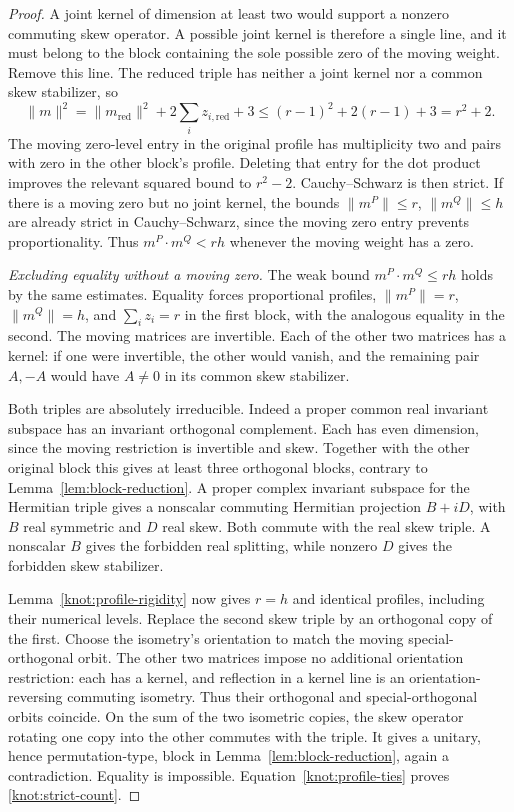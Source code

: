 \begin{proof}
A joint kernel of dimension at least two would support a nonzero
commuting skew operator.  A possible joint kernel is therefore a
single line, and it must belong to the block containing the sole
possible zero of the moving weight.  Remove this line.  The reduced
triple has neither a joint kernel nor a common skew stabilizer, so
\[
 \|m\|^2
 =\|m_{\mathrm{red}}\|^2+2\sum_i z_{i,\mathrm{red}}+3
 \le(r-1)^2+2(r-1)+3=r^2+2.
\]
The moving zero-level entry in the original profile has multiplicity
two and pairs with zero in the other block's profile.  Deleting that
entry for the dot product improves the relevant squared bound to
\(r^2-2\).  Cauchy--Schwarz is then strict.  If there is a moving zero
but no joint kernel, the bounds \(\|m^P\|\le r\),
\(\|m^Q\|\le h\) are already strict in Cauchy--Schwarz, since the
moving zero entry prevents proportionality.  Thus
\(m^P\cdot m^Q<rh\) whenever the moving weight has a zero.

\emph{Excluding equality without a moving zero.}
The weak bound \(m^P\cdot m^Q\le rh\) holds by the same estimates.
Equality forces proportional profiles, \(\|m^P\|=r\),
\(\|m^Q\|=h\), and \(\sum_i z_i=r\) in the first block, with the
analogous equality in the second.  The moving matrices are invertible.
Each of the other two matrices has a kernel: if one were invertible,
the other would vanish, and the remaining pair \(A,-A\) would have
\(A\ne0\) in its common skew stabilizer.

Both triples are absolutely irreducible.  Indeed a proper common real
invariant subspace has an invariant orthogonal complement.  Each has
even dimension, since the moving restriction is invertible and skew.
Together with the other original block this gives at least three
orthogonal blocks, contrary to Lemma~\ref{lem:block-reduction}.  A
proper complex invariant subspace for the Hermitian triple gives a
nonscalar commuting Hermitian projection \(B+iD\), with \(B\) real
symmetric and \(D\) real skew.  Both commute with the real skew triple.
A nonscalar \(B\) gives the forbidden real splitting, while nonzero
\(D\) gives the forbidden skew stabilizer.

Lemma~\ref{knot:profile-rigidity} now gives \(r=h\) and identical
profiles, including their numerical levels.  Replace the second skew
triple by an orthogonal copy of the first.  Choose the isometry's
orientation to match the moving special-orthogonal orbit.  The other
two matrices impose no additional orientation restriction: each has a
kernel, and reflection in a kernel line is an orientation-reversing
commuting isometry.  Thus their orthogonal and special-orthogonal
orbits coincide.  On the sum of the two isometric copies, the skew
operator rotating one copy into the other commutes with the triple.
It gives a unitary, hence permutation-type, block in
Lemma~\ref{lem:block-reduction}, again a contradiction.  Equality is
impossible.  Equation~\eqref{knot:profile-ties} proves
\eqref{knot:strict-count}.
\end{proof}

